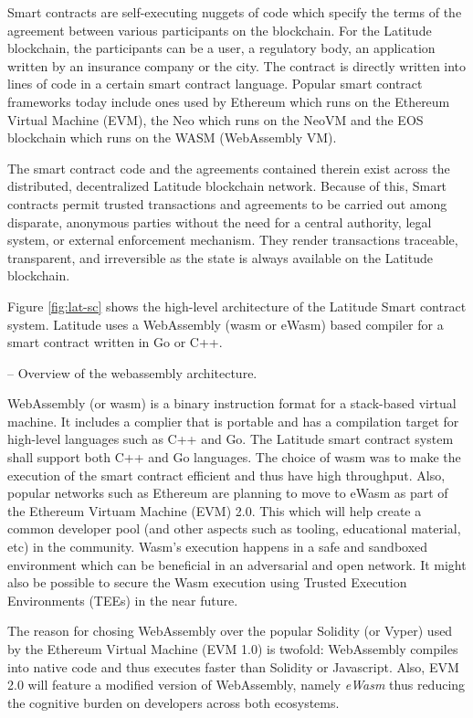Smart contracts are self-executing nuggets of code which specify the terms of the agreement between various participants
on the blockchain. For the Latitude blockchain, the participants can be a user, a regulatory body, an application
written by an insurance company or the city. The contract is directly written into lines of code in a certain smart
contract language. Popular smart contract frameworks today include ones used by Ethereum which runs on the Ethereum Virtual Machine (EVM),
the Neo which runs on the NeoVM and the EOS blockchain which runs on the WASM (WebAssembly VM).

The smart contract code and the agreements contained therein exist across the distributed, decentralized Latitude
blockchain network.  Because of this, Smart contracts permit trusted transactions and agreements to be carried out among
disparate, anonymous parties without the need for a central authority, legal system, or external enforcement mechanism.
They render transactions traceable, transparent, and irreversible as the state is always available on the Latitude
blockchain.

Figure \ref{fig:lat-sc} shows the high-level architecture of the Latitude Smart contract system. Latitude uses a
WebAssembly (wasm or eWasm) based compiler for a smart contract written in Go or C++. 

-- Overview of the webassembly architecture.

WebAssembly (or wasm) is a binary instruction format for a stack-based virtual machine. It includes a complier that is
portable and has a compilation target for high-level languages such as C++ and Go. The Latitude smart contract system
shall support both C++ and Go languages. The choice of wasm was to make the execution of the smart contract efficient
and thus have high throughput. Also, popular networks such as Ethereum are planning to move to eWasm as part of the
Ethereum Virtuam Machine (EVM) 2.0. This which will help create a common developer pool (and other aspects such as
tooling, educational material, etc) in the community. Wasm's execution happens in a safe and sandboxed
environment which can be beneficial in an adversarial and open network. It might also be possible to secure the Wasm
execution using Trusted Execution Environments (TEEs) in the near future.

The reason for chosing WebAssembly over the popular Solidity (or Vyper) used by the Ethereum Virtual Machine (EVM 1.0)
is twofold: 
WebAssembly compiles into native code and thus executes faster than Solidity or Javascript. Also, EVM 2.0 will feature
a modified version of WebAssembly, namely {\it eWasm} thus reducing the cognitive burden on developers across both
ecosystems.


